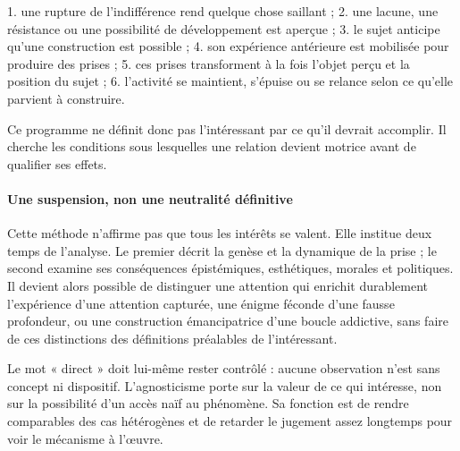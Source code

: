 \documentclass[10pt,a4paper]{article}
\begin{document}
1. une rupture de l'indifférence rend quelque chose saillant ; 2. une lacune, une résistance ou une possibilité de développement est aperçue ; 3. le sujet anticipe qu'une construction est possible ; 4. son expérience antérieure est mobilisée pour produire des prises ; 5. ces prises transforment à la fois l'objet perçu et la position du sujet ; 6. l'activité se maintient, s'épuise ou se relance selon ce qu'elle parvient à    construire.

Ce programme ne définit donc pas l'intéressant par ce qu'il devrait accomplir. Il cherche les conditions sous lesquelles une relation devient motrice avant de qualifier ses effets.

\paragraph{Une suspension, non une neutralité définitive}
Cette méthode n'affirme pas que tous les intérêts se valent. Elle institue deux temps de l'analyse. Le premier décrit la genèse et la dynamique de la prise ; le second examine ses conséquences épistémiques, esthétiques, morales et politiques. Il devient alors possible de distinguer une attention qui enrichit durablement l'expérience d'une attention capturée, une énigme féconde d'une fausse profondeur, ou une construction émancipatrice d'une boucle addictive, sans faire de ces distinctions des définitions préalables de l'intéressant.

Le mot « direct » doit lui-même rester contrôlé : aucune observation n'est sans concept ni dispositif. L'agnosticisme porte sur la valeur de ce qui intéresse, non sur la possibilité d'un accès naïf au phénomène. Sa fonction est de rendre comparables des cas hétérogènes et de retarder le jugement assez longtemps pour voir le mécanisme à l'œuvre.
\end{document}
